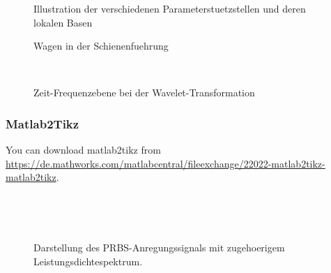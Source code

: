 \begin{figure}[ht]
	\centering
	
	\caption{Illustration der verschiedenen Parameterstuetzstellen und deren lokalen Basen}
	\label{fig:ableitung_V}
\end{figure} 

\begin{figure}[hbp]
	\centering
	
	\caption{Wagen in der Schienenfuehrung}
	\label{fig:aufbau:wagen}
\end{figure}

\begin{figure}
	\centering
	\begin{minipage}[c]{\textwidth}
		\centering
		
		\caption{Zeit-Skalierungsebene bei der Wavelet-Transformation}
		\label{fig:cwt_a}
	\end{minipage}\\[1em]
	\begin{minipage}[c]{\textwidth}
		\centering
		
		\caption{Zeit-Frequenzebene bei der Wavelet-Transformation}
		\label{fig:cwt_f}
	\end{minipage}
\end{figure}

\subsubsection{Matlab2Tikz}
You can download matlab2tikz from \url{https://de.mathworks.com/matlabcentral/fileexchange/22022-matlab2tikz-matlab2tikz}.

\begin{figure}[t!]
	\centering
	\begin{minipage}{0.95\linewidth}
		\centering
		\setlength\figureheight{3.3cm}
		\setlength{}
		
	\end{minipage}
	\\[0.6em]
	\begin{minipage}{0.95\linewidth}
		\centering
		\setlength\figureheight{3.3cm}
		\setlength{}
		
	\end{minipage}
	\\[0.3em]
	\caption[PRBS-Anregungssignal mit zugehoerigem Leistungsdichtespektrum]{Darstellung des PRBS-Anregungssignals mit zugehoerigem Leistungsdichtespektrum.}
	\label{fig:prbs}
\end{figure}

